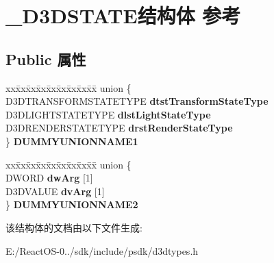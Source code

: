 \hypertarget{struct___d3_d_s_t_a_t_e}{}\section{\+\_\+\+D3\+D\+S\+T\+A\+T\+E结构体 参考}
\label{struct___d3_d_s_t_a_t_e}
\subsection*{Public 属性}
\begin{DoxyCompactItemize}
\item 
\mbox{\label{struct___d3_d_s_t_a_t_e_a84b94ef93ae63f2352304ac1ef0b88c8}} 
\begin{tabbing}
xx\=xx\=xx\=xx\=xx\=xx\=xx\=xx\=xx\=\kill
union \{\\
\>D3DTRANSFORMSTATETYPE {\bfseries dtstTransformStateType}\\
\>D3DLIGHTSTATETYPE {\bfseries dlstLightStateType}\\
\>D3DRENDERSTATETYPE {\bfseries drstRenderStateType}\\
\} {\bfseries DUMMYUNIONNAME1}\\

\end{tabbing}\item 
\mbox{\label{struct___d3_d_s_t_a_t_e_a92dd9b8fa8ae698ba8c4d34a6f0bfe6e}} 
\begin{tabbing}
xx\=xx\=xx\=xx\=xx\=xx\=xx\=xx\=xx\=\kill
union \{\\
\>DWORD {\bfseries dwArg} \mbox{[}1\mbox{]}\\
\>D3DVALUE {\bfseries dvArg} \mbox{[}1\mbox{]}\\
\} {\bfseries DUMMYUNIONNAME2}\\

\end{tabbing}\end{DoxyCompactItemize}


该结构体的文档由以下文件生成\+:\begin{DoxyCompactItemize}
\item 
E\+:/\+React\+O\+S-\/0../sdk/include/psdk/d3dtypes.\+h\end{DoxyCompactItemize}
